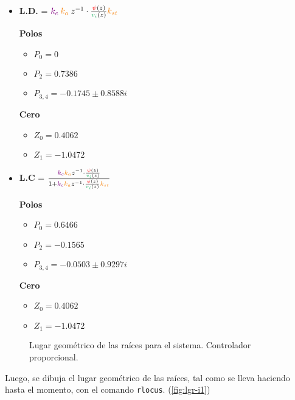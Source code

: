 \begin{itemize}
  \item \textbf{L.D.} = \( \mora{k_{c}} \nara{ k_{a}} z^{-1} \cdot \frac{\rojo{\psi}(z)}{\verd{v_i}(z)} \nara{k_{st}} \) 
 
  \begin{multicols}{2}
    \textbf{Polos}
    \begin{itemize}
      \item \(P_{0} = 0 \)
      \item \(P_{2} = 0.7386\)
      \item \(P_{3,4} = -0.1745 \pm 0.8588i\) 
    \end{itemize}
    \columnbreak
    \textbf{Cero}
    \begin{itemize}
      \item \(Z_0 = 0.4062\)
      \item \(Z_1 = -1.0472\)
    \end{itemize}
  \end{multicols}
  
  \item \textbf{L.C} =  \(\frac{  \mora{k_{c}} \nara{ k_{a}} z^{-1} \cdot \frac{\rojo{\psi}(z)}{\verd{v_i}(z)}} {1+ \mora{k_{c}} \nara{ k_{a}} z^{-1} \cdot \frac{\rojo{\psi}(z)}{\verd{v_i}(z)} \nara{k_{st}} }  \)
  
  \begin{multicols}{2}
    \textbf{Polos}
    \begin{itemize}
      \item \(P_{0} = 0.6466 \)
      \item \(P_{2} = -0.1565\)
      \item \(P_{3,4} = -0.0503 \pm 0.9297i\) 
    \end{itemize}
    \columnbreak
    \textbf{Cero}
    \begin{itemize}
      \item \(Z_0 = 0.4062\)
      \item \(Z_1 = -1.0472\)
    \end{itemize}
  \end{multicols}
\end{itemize}

\begin{figure}[ht]
    \centering
    
    \caption{Lugar geométrico de las raíces para el sistema. Controlador proporcional.}
    \label{fig:lgr-i1}
\end{figure}

Luego, se dibuja el lugar geométrico de las raíces, tal como se lleva haciendo
hasta el momento, con el comando \verb|rlocus|. (\autoref{fig:lgr-i1})
\newpage

